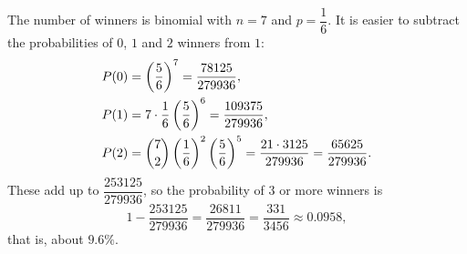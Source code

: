 The number of winners is binomial with $n=7$ and $p=\dfrac16$. It is easier to subtract the probabilities of $0$, $1$ and $2$ winners from $1$:
\begin{align*}
P(0)&=\left(\dfrac56\right)^7=\dfrac{78125}{279936},\\
P(1)&=7\cdot\dfrac16\left(\dfrac56\right)^6=\dfrac{109375}{279936},\\
P(2)&=\dbinom72\left(\dfrac16\right)^2\left(\dfrac56\right)^5=\dfrac{21\cdot3125}{279936}=\dfrac{65625}{279936}.
\end{align*}
These add up to $\dfrac{253125}{279936}$, so the probability of $3$ or more winners is
\[1-\dfrac{253125}{279936}=\dfrac{26811}{279936}=\boxed{\dfrac{331}{3456}}\approx0.0958,\]
that is, about $9.6\%$.
